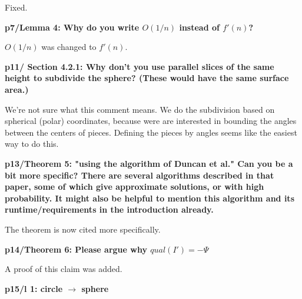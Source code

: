 \documentclass[lotsofwhite]{patmorin}
\newenvironment{comment}{\noindent\bf}{}
\newenvironment{response}{\noindent}{}
\begin{document}
\begin{response}
Fixed.
\end{response}


\begin{comment}
p7/Lemma 4: Why do you write $O(1/n)$ instead of $f'(n)$?
\end{comment}

\begin{response}
$O(1/n)$ was changed to $f'(n)$.
\end{response}

\begin{comment}
p11/ Section 4.2.1: Why don't you use parallel slices of the same
height to subdivide the sphere? (These would have the same surface
area.) 
\end{comment}

\begin{response}
We're not sure what this comment means.  We do the subdivision based
on spherical (polar) coordinates, because were are interested in
bounding the angles between the centers of pieces.  Defining the
pieces by angles seems like the easiest way to do this.
\end{response}

\begin{comment}
p13/Theorem 5: "using the algorithm of Duncan et al." Can you be a bit
more specific? There are several algorithms described in that paper,
some of which give approximate solutions, or with high probability. It
might also be helpful to mention this algorithm and its
runtime/requirements in the introduction already.
\end{comment}

\begin{response}
The theorem is now cited more specifically.
\end{response}


\begin{comment}
p14/Theorem 6: Please argue why $qual(I') = -\Psi$
\end{comment}

\begin{response}
A proof of this claim was added.
\end{response}


\begin{comment}
p15/l 1: circle $\rightarrow$ sphere
\end{comment}
\end{document}
